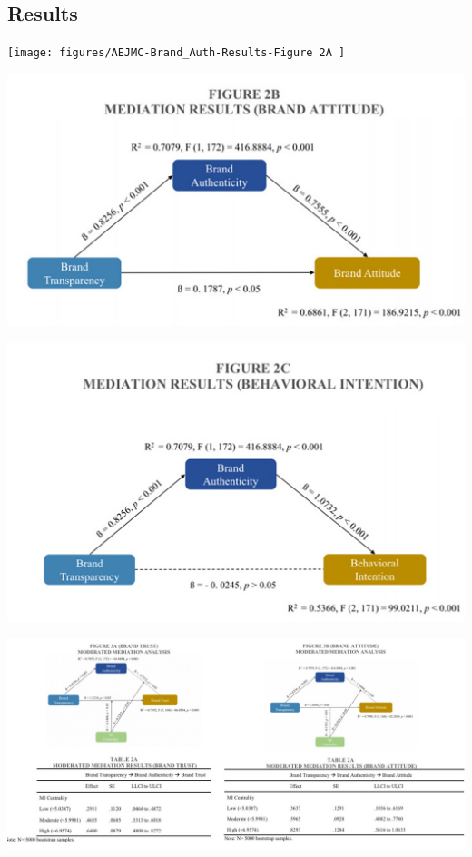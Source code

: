 \documentclass[a0,portrait]{a0poster}
\begin{document}
\begin{minipage}[c]{\linewidth}
\begin{framed}
\begin{multicols}{2}
\color{Maroon}
\section*{Results}
\color{Black}

\begin{center}
\texttt{[image: figures/AEJMC-Brand\_Auth-Results-Figure 2A ]}
\label{ALICerros}
\end{center}

\begin{center}
\includegraphics[width=0.5\linewidth]{figures/AEJMC-Brand_Auth-Results-Figure 2B}
\label{ALICerros}
\end{center}

\begin{center}
\includegraphics[width=0.5\linewidth]{figures/AEJMC-Brand_Auth-Results-Figure 2C}
\label{ALICerros}
\end{center}

\begin{center}
\includegraphics[width=0.7\linewidth]{AEJMC-Brand_Auth-Results-3A_3B}
\label{ALICerros}
\end{center}
\color{Maroon}

\end{multicols}
\end{framed}
\end{minipage}
\end{document}
